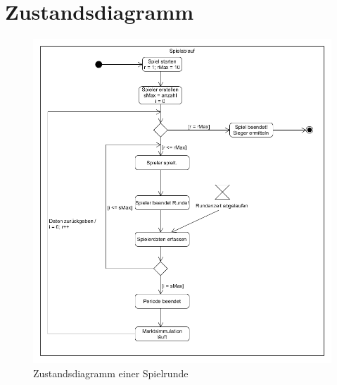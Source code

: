 \clearpage
\section{Zustandsdiagramm}
\begin{figure} [!h]
	\centering
	\includegraphics[scale=0.5]{img/Spielablauf.png} 
	\caption{Zustandsdiagramm einer Spielrunde} \label{fig:abb28}
\end{figure}





